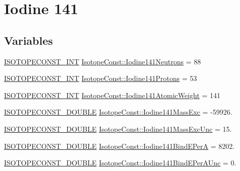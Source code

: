 \hypertarget{group___isotope_const-_iodine-_i141}{}\section{Iodine 141}
\label{group___isotope_const-_iodine-_i141}
\subsection*{Variables}
\begin{DoxyCompactItemize}
\item 
\mbox{\hyperlink{group___isotope_const-_macros_ga5f18360b3e99483a35c32d789e62621c}{I\+S\+O\+T\+O\+P\+E\+C\+O\+N\+S\+T\+\_\+\+I\+NT}} \mbox{\hyperlink{group___isotope_const-_iodine-_i141_gaceacd271c789204564722f19b34bca22}{Isotope\+Const\+::\+Iodine141\+Neutrons}} = 88
\item 
\mbox{\hyperlink{group___isotope_const-_macros_ga5f18360b3e99483a35c32d789e62621c}{I\+S\+O\+T\+O\+P\+E\+C\+O\+N\+S\+T\+\_\+\+I\+NT}} \mbox{\hyperlink{group___isotope_const-_iodine-_i141_ga168cf300fa42e3e33d8f031062330108}{Isotope\+Const\+::\+Iodine141\+Protons}} = 53
\item 
\mbox{\hyperlink{group___isotope_const-_macros_ga5f18360b3e99483a35c32d789e62621c}{I\+S\+O\+T\+O\+P\+E\+C\+O\+N\+S\+T\+\_\+\+I\+NT}} \mbox{\hyperlink{group___isotope_const-_iodine-_i141_ga38a2052a3e83c41fa67ee0b27948640c}{Isotope\+Const\+::\+Iodine141\+Atomic\+Weight}} = 141
\item 
\mbox{\hyperlink{group___isotope_const-_macros_ga8f45a7272ce02c0b4c65c44636ed719a}{I\+S\+O\+T\+O\+P\+E\+C\+O\+N\+S\+T\+\_\+\+D\+O\+U\+B\+LE}} \mbox{\hyperlink{group___isotope_const-_iodine-_i141_ga08e41e889c31552452855b923eade005}{Isotope\+Const\+::\+Iodine141\+Mass\+Exc}} = -\/59926.
\item 
\mbox{\hyperlink{group___isotope_const-_macros_ga8f45a7272ce02c0b4c65c44636ed719a}{I\+S\+O\+T\+O\+P\+E\+C\+O\+N\+S\+T\+\_\+\+D\+O\+U\+B\+LE}} \mbox{\hyperlink{group___isotope_const-_iodine-_i141_ga8314c1f36ddc2829486e8e6addf41ba5}{Isotope\+Const\+::\+Iodine141\+Mass\+Exc\+Unc}} = 15.
\item 
\mbox{\hyperlink{group___isotope_const-_macros_ga8f45a7272ce02c0b4c65c44636ed719a}{I\+S\+O\+T\+O\+P\+E\+C\+O\+N\+S\+T\+\_\+\+D\+O\+U\+B\+LE}} \mbox{\hyperlink{group___isotope_const-_iodine-_i141_ga965772ab268bdb77a4dec9be714e7165}{Isotope\+Const\+::\+Iodine141\+Bind\+E\+PerA}} = 8202.
\item 
\mbox{\hyperlink{group___isotope_const-_macros_ga8f45a7272ce02c0b4c65c44636ed719a}{I\+S\+O\+T\+O\+P\+E\+C\+O\+N\+S\+T\+\_\+\+D\+O\+U\+B\+LE}} \mbox{\hyperlink{group___isotope_const-_iodine-_i141_gaef57d9d54984e861dd2bbd49fe8a2be7}{Isotope\+Const\+::\+Iodine141\+Bind\+E\+Per\+A\+Unc}} = 0.

\end{DoxyCompactItemize}
